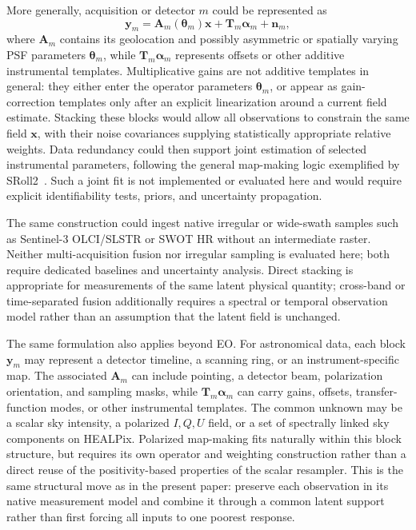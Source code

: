 \documentclass[journal]{IEEEtran}
\newcommand{\healpix}{HEALPix\xspace}
\newcommand{\psf}{PSF\xspace}
\begin{document}
More generally, acquisition or detector $m$ could be represented as
\begin{equation}
\mathbf y_m = \mathbf A_m(\boldsymbol\theta_m)\mathbf x
             + \mathbf T_m\boldsymbol\alpha_m + \mathbf n_m,
\label{eq:multi_observation_outlook}
\end{equation}
where $\mathbf A_m$ contains its geolocation and possibly asymmetric
or spatially varying \psf parameters $\boldsymbol\theta_m$, while
$\mathbf T_m\boldsymbol\alpha_m$ represents offsets or other additive
instrumental templates. Multiplicative gains are not additive templates in
general: they either enter the operator parameters $\boldsymbol\theta_m$, or
appear as gain-correction templates only after an explicit linearization
around a current field estimate. Stacking these blocks would allow all
observations to constrain the same field $\mathbf x$, with their
noise covariances supplying statistically appropriate relative
weights. Data redundancy could then support joint estimation of
selected instrumental parameters, following the general map-making
logic exemplified by SRoll2~\cite{delouis2019sroll2}. Such a joint fit
is not implemented or evaluated here and would require explicit
identifiability tests, priors, and uncertainty propagation.

The same construction could ingest native irregular or wide-swath
samples such as Sentinel-3 OLCI/SLSTR or SWOT HR without an
intermediate raster. Neither multi-acquisition fusion nor irregular
sampling is evaluated here; both require dedicated baselines and
uncertainty analysis. Direct stacking is appropriate for measurements
of the same latent physical quantity; cross-band or time-separated
fusion additionally requires a spectral or temporal observation
model rather than an assumption that the latent field is unchanged.

The same formulation also applies beyond EO. For astronomical data, each
block $\mathbf y_m$ may represent a detector timeline, a scanning ring, or an
instrument-specific map. The associated $\mathbf A_m$ can include pointing,
a detector beam, polarization orientation, and sampling masks, while
$\mathbf T_m\boldsymbol\alpha_m$ can carry gains, offsets, transfer-function
modes, or other instrumental templates. The common unknown may be a scalar
sky intensity, a polarized $I,Q,U$ field, or a set of spectrally linked sky
components on \healpix. Polarized map-making fits naturally within this block
structure, but requires its own operator and weighting construction rather
than a direct reuse of the positivity-based properties of the scalar
resampler. This is the same structural move as in the present
paper: preserve each observation in its native measurement model and combine
it through a common latent support rather than first forcing all inputs to one
poorest response.
\end{document}
